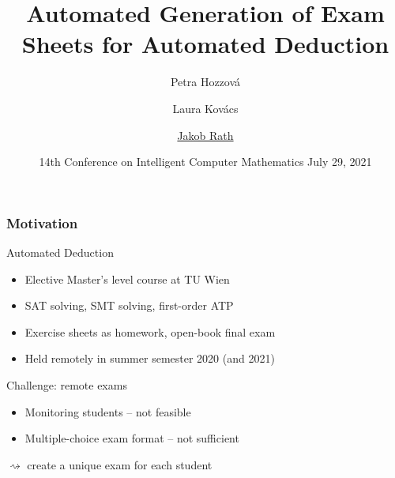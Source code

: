 \documentclass[xcolor={table}]{beamer}
\title{Automated Generation of Exam Sheets for Automated Deduction} %
\author{
    Petra Hozzov\'a
    \and
    Laura Kov\'acs
    \and
    \texorpdfstring{\underline{Jakob Rath}}{Jakob Rath}
}
\institute{Vienna University of Technology}
\date{%
    \small%
    14th Conference on Intelligent Computer Mathematics\br%
    July 29, 2021%
}
\begin{document}
\begin{frame}[plain]
\titlepage %
\end{frame}
\addtocounter{framenumber}{-1}



\begin{frame}
\frametitle{Motivation}

    \begin{block}{Automated Deduction}
        \begin{itemize}
            \item Elective Master's level course at TU Wien
            \item SAT solving, SMT solving, first-order ATP
            \item Exercise sheets as homework, open-book final exam
            \item Held remotely in summer semester 2020 (and 2021)
        \end{itemize}
    \end{block}



    \medskip
    \pause

    \begin{alertblock}{Challenge: remote exams}
        \begin{itemize}
            \item Monitoring students -- not feasible
            \item Multiple-choice exam format -- not sufficient
        \end{itemize}
    \end{alertblock}
    \pause
    \vspace*{1em}
    \qquad $\rightsquigarrow$ create a unique exam for each student
\end{frame}
\end{document}
